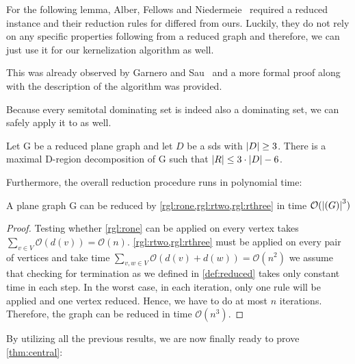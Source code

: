 For the following lemma, Alber, Fellows and Niedermeie~\cite{Alber2004} required a reduced instance and their reduction rules for \pdom differed from ours. Luckily, they do not rely on any specific properties following from a reduced graph and therefore, we can just use it for our kernelization algorithm as well.

This was already observed by Garnero and Sau~\cite{Garnero2018} and a more formal proof along with the description of the algorithm was provided.

Because every semitotal dominating set is indeed also a dominating set, we can safely apply it to \psdom as well. 

\begin{lemma}\label{lemma:numRegions}
    Let G be a reduced plane graph and let $D$ be a sds with $\abs{D}\geq 3$. There is a maximal D-region decomposition of G such that $\abs{R} \leq 3 \cdot \abs{D} - 6$.
\end{lemma}

Furthermore, the overall reduction procedure runs in polynomial time:

\begin{lemma}\label{lemma:runtime}
    A plane graph G can be reduced by \cref{rgl:rone,rgl:rtwo,rgl:rthree} in time $\mathcal{O}(\abs{(G)}^3)$
\end{lemma}
\begin{proof} 
Testing whether \cref{rgl:rone} can be applied on every vertex takes $\sum_{v\in V} \mathcal{O}(d(v)) = \mathcal{O}(n)$.
\cref{rgl:rtwo,rgl:rthree} must be applied on every pair of vertices and take time $\sum_{v,w \in V}\mathcal{O}(d(v) + d(w)) = \mathcal{O}(n^2)$
we assume that checking for termination as we defined in \cref{def:reduced} takes only constant time in each step.
In the worst case, in each iteration, only one rule will be applied and one vertex reduced. 
Hence, we have to do at most $n$ iterations.
Therefore, the graph can be reduced in time $\mathcal{O}(n^3)$.
\end{proof}

\noindent By utilizing all the previous results, we are now finally ready to prove \cref{thm:central}: 

\centraltheo*

